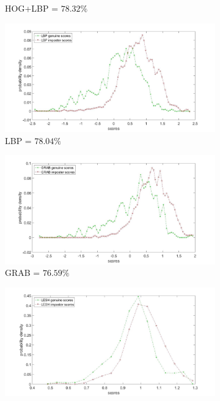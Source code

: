 \documentclass[english, 12pt]{article}
\begin{document}
\begin{figure}[H]
\begin{subfigure}[b]{0.44\textwidth}
        \caption{HOG+LBP = $78.32\%$}
        \label{fig:HOGLBP}
    \end{subfigure}
    \begin{subfigure}[b]{0.44\textwidth}
        \includegraphics[width=\textwidth]{LBP.jpg}
        \caption{LBP = $78.04\%$}
        \label{fig:LBP}
    \end{subfigure}
    \begin{subfigure}[b]{0.44\textwidth}
        \includegraphics[width=\textwidth]{GRAB.jpg}
        \caption{GRAB = $76.59\%$}
        \label{fig:GRAB}
    \end{subfigure}
        \begin{subfigure}[b]{0.44\textwidth}
        \includegraphics[width=\textwidth]{LESH.jpg}

\end{subfigure}
\end{figure}
\end{document}
